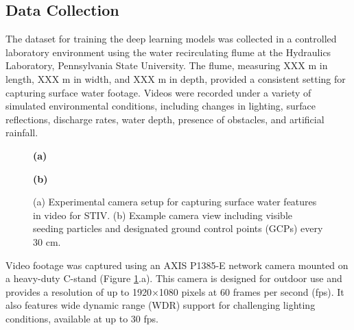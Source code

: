 \documentclass[12pt]{elsarticle}
\begin{document}
\subsection{Data Collection}
The dataset for training the deep learning models was collected in a controlled laboratory environment using the water recirculating flume at the Hydraulics Laboratory, Pennsylvania State University. The flume, measuring XXX m in length, XXX m in width, and XXX m in depth, provided a consistent setting for capturing surface water footage. Videos were recorded under a variety of simulated environmental conditions, including changes in lighting, surface reflections, discharge rates, water depth, presence of obstacles, and artificial rainfall.
\begin{figure}[!htbp]
    \centering
    \begin{minipage}[b]{0.48\textwidth}
        \centering
        \setlength{\fboxsep}{0pt}
        \textbf{(a)} 
    \end{minipage}
    \hfill
    \begin{minipage}[b]{0.48\textwidth}
        \centering
        \setlength{\fboxsep}{0pt}
        \textbf{(b)}
    \end{minipage}
    \caption{(a) Experimental camera setup for capturing surface water features in video for STIV. (b) Example camera view including visible seeding particles and designated ground control points (GCPs) every 30 cm.}
    \label{fig:camera_setup}
\end{figure}

Video footage was captured using an AXIS P1385-E network camera mounted on a heavy-duty C-stand (Figure \ref{fig:camera_setup}.a). This camera is designed for outdoor use and provides a resolution of up to 1920×1080 pixels at 60 frames per second (fps). It also features wide dynamic range (WDR) support for challenging lighting conditions, available at up to 30 fps.
\end{document}
